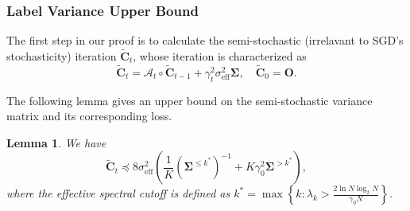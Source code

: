 \documentclass{article}
\theoremstyle{definition}
\theoremstyle{definition}
\theoremstyle{plain}
\theoremstyle{plain}
\theoremstyle{plain}
\newtheorem{lemma}{Lemma}
\theoremstyle{plain}
\theoremstyle{plain}
\newcommand{\bs}[1]{\boldsymbol{\mathbf{#1}}}
\newcommand{\mc}[1]{{\mathcal{#1}}}
\newcommand{\eff}{\mathrm{eff}}
\newcommand{\Sig}{\mathbf{\Sigma}}
\begin{document}
\subsubsection{Label Variance Upper Bound}\label{varianceupperdirect}

The first step in our proof is to calculate the semi-stochastic (irrelavant to SGD's stochasticity) iteration $\tilde{\bs C}_t$, whose iteration is characterized as
\begin{equation}
    \tilde{\bs C}_t =  {\mc A}_t\circ \tilde{\bs C}_{t-1} + \gamma_t^2{\sigma}_\eff^2\bs\Sigma,\quad  \tilde{\bs C}_0 = \bs O.
\end{equation}

The following lemma gives an upper bound on the semi-stochastic variance matrix and its corresponding loss.

\begin{lemma}\label{determvarmat}
We have
\begin{equation}
    \tilde{\bs C}_t\preceq 8{\sigma}_\eff^2\left( \frac{1}{K}(\Sig^{\leq k^*})^{-1}  +K\gamma_0^2 \Sig^{>k^*} \right),
\end{equation}
where the effective spectral cutoff is defined as $k^* = \max\left\{k:\lambda_{k}> \frac{2\ln N\log_2 N}{\gamma_0 N} \right\}$.
\end{lemma}
\end{document}
